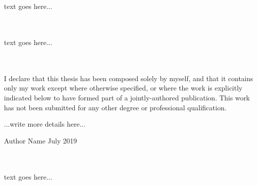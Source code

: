 

\newpage
{}\\ \\

text goes here...


\newpage
{}\\ \\

text goes here...


\newpage
{}\\ \\

I declare that this thesis has been composed solely by myself, and that it contains only my work except where otherwise specified, or where the work is explicitly indicated below to have formed part of a jointly-authored publication. This work has not been submitted for any other degree or professional qualification.\newline

\noindent
...write more details here...

\begin{flushright}
\hspace*{\fill}Author Name\newline
July 2019
\end{flushright}


\newpage
{}\\ \\

text goes here...

\newpage

\begin{spacing}{1}
    \tableofcontents
    \listoffigures
    \listoftables
    \printglossary
\end{spacing}